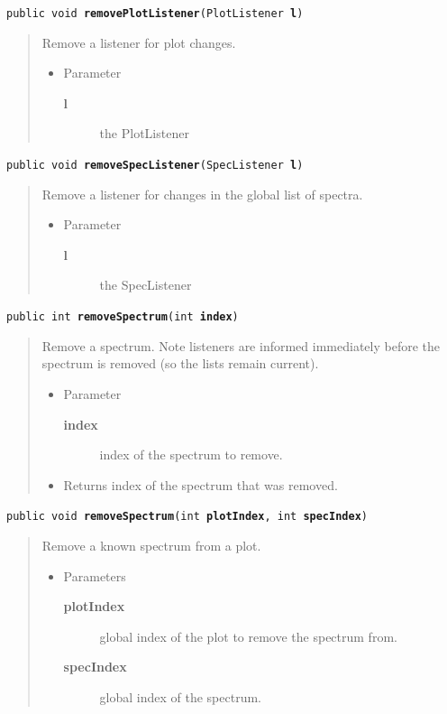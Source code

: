 \documentclass[twoside,11pt]{article}
\renewcommand{\_}{\texttt{\symbol{95}}}
\newcommand{\method}[1]{\texttt{#1}}
\newenvironment{desc}{\begin{quote}}{\end{quote}}
\begin{document}
\method{public void \textbf{removePlotListener}(\texttt{PlotListener} \textbf{l})\label{l307}\label{l308}}
\begin{desc}Remove a listener for plot changes.
\begin{itemize}
\item{Parameter
  \begin{description}
   \item[\textbf{l}]{the PlotListener}
  \end{description}}
\end{itemize}
\end{desc}

\method{public void \textbf{removeSpecListener}(\texttt{SpecListener} \textbf{l})\label{l309}\label{l310}}
\begin{desc}Remove a listener for changes in the global list of spectra.
\begin{itemize}
\item{Parameter
  \begin{description}
   \item[\textbf{l}]{the SpecListener}
  \end{description}}
\end{itemize}
\end{desc}

\method{public int \textbf{removeSpectrum}(\texttt{int} \textbf{index})\label{l311}\label{l312}}
\begin{desc}Remove a spectrum. Note listeners are informed immediately
  before the spectrum is removed (so the lists remain current).
\begin{itemize}
\item{Parameter
  \begin{description}
   \item[\textbf{index}]{index of the spectrum to remove.}
  \end{description}}
\end{itemize}
\begin{itemize}
\item{Returns index of the spectrum that was removed. }
\end{itemize}
\end{desc}

\method{public void \textbf{removeSpectrum}(\texttt{int} \textbf{plotIndex}, \texttt{int} \textbf{specIndex})\label{l313}\label{l314}}
\begin{desc}Remove a known spectrum from a plot.
\begin{itemize}
\item{Parameters
  \begin{description}
   \item[\textbf{plotIndex}]{global index of the plot to remove the
                   spectrum from.}
   \item[\textbf{specIndex}]{global index of the spectrum.}
  \end{description}}
\end{itemize}
\end{desc}
\end{document}
